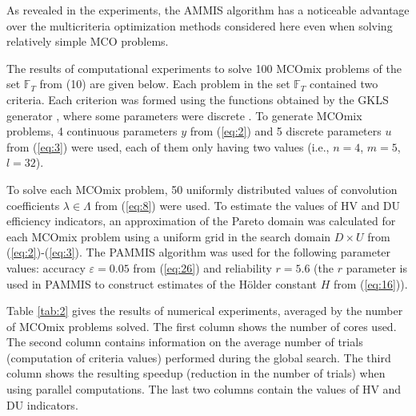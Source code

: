 \documentclass{svproc}
\begin{document}
As revealed in the experiments, the AMMIS algorithm has a noticeable advantage over the multicriteria optimization methods considered here even when solving relatively simple MCO problems.

The results of computational experiments to solve 100 MCOmix problems of the set $\mathbb{F}_T$ from (10) are given below. Each problem in the set $\mathbb{F}_T$ contained two criteria. Each criterion was formed using the functions obtained by the GKLS generator \cite{c44}, where some parameters were discrete \cite{c45}. To generate MCOmix problems, 4 continuous parameters $y$ from (\ref{eq:2}) and 5 discrete parameters $u$ from (\ref{eq:3}) were used, each of them only having two values (i.e., $n=4$, $m=5$, $l=32$).
 
To solve each MCOmix problem, 50 uniformly distributed values of convolution coefficients $\lambda \in \Lambda$ from (\ref{eq:8}) were used. To estimate the values of HV and DU efficiency indicators, an approximation of the Pareto domain was calculated for each MCOmix problem  using a uniform grid in the search domain $D\times U$ from (\ref{eq:2})-(\ref{eq:3}). The PAMMIS algorithm was used for the following parameter values: accuracy $\varepsilon=0.05$ from (\ref{eq:26}) and reliability $r=5.6$ (the $r$ parameter is used in PAMMIS to construct estimates of the H{\"o}lder constant $H$ from (\ref{eq:16})). 

Table \ref{tab:2} gives the results of numerical experiments, averaged by the number of MCOmix problems solved. The first column shows the number of cores used. The second column contains information on the average number of trials (computation of criteria values) performed during the global search. The third column shows the resulting speedup (reduction in the number of trials) when using parallel computations. The last two columns contain the values of HV and DU indicators.
\end{document}
